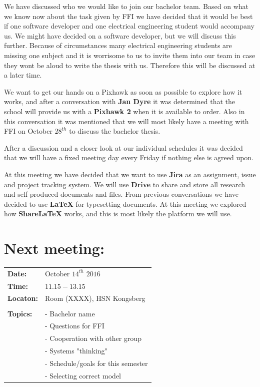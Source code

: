 \documentclass{article}
\begin{document}
We have discussed who we would like to join our bachelor team. Based on what we know now about the task given by FFI we have decided that it would be best if one software developer and one electrical engineering student would accompany us. We might have decided on a software developer, but we will discuss this further. Because of circumstances many electrical engineering students are missing one subject and it is worrisome to us to invite them into our team in case they wont be aloud to write the thesis with us. Therefore this will be discussed at a later time.

We want to get our hands on a Pixhawk as soon as possible to explore how it works, and after a conversation with \textbf{Jan Dyre} it was determined that the school will provide us with a \textbf{Pixhawk 2} when it is available to order. Also in this conversation it was mentioned that we will most likely have a meeting with FFI on October $28^{th}$ to discuss the bachelor thesis.

After a discussion and a closer look at our individual schedules it was decided that we will have a fixed meeting day every Friday if nothing else is agreed upon.  

At this meeting we have decided that we want to use \textbf{Jira} as an assignment, issue and project tracking system. We will use \textbf{Drive} to share and store all research and self produced documents and files. From previous conversations we have decided to use \textbf{LaTeX} for typesetting documents. At this meeting we explored how \textbf{ShareLaTeX} works, and this is most likely the platform we will use. 









\section*{Next meeting:}   
\begin{tabular}{ll}                                              
\textbf{Date:} 	            & October $14^{th}$ $2016$	         \\
\textbf{Time:}		        & $11.15-13.15$				         \\
\textbf{Locaton:}	        & Room (XXXX), HSN Kongsberg	     \\\\
\textbf{Topics:}            & - Bachelor name 			         \\
				        	& - Questions for FFI                \\  
				        	& - Cooperation with other group     \\
				        	& - Systems "thinking"	    	     \\
				        	& - Schedule/goals for this semester \\
				        	& - Selecting correct model          \\
				        	

\end{tabular}
\end{document}
